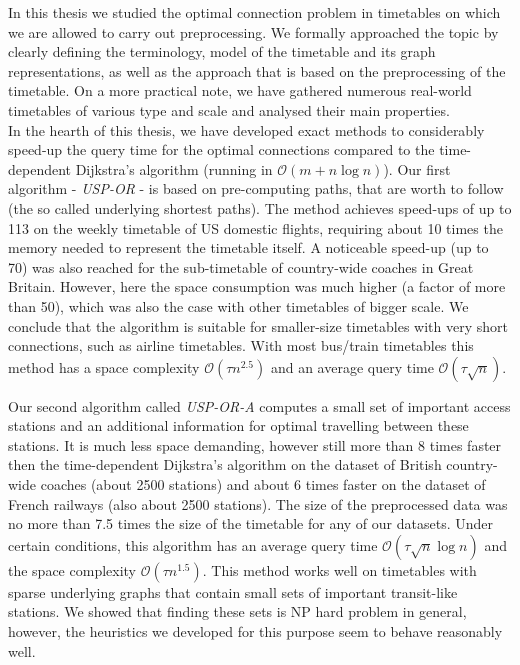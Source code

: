 \noindent In this thesis we studied the optimal connection problem in timetables on which we are allowed to carry out preprocessing. We formally approached the topic by clearly defining the terminology, model of the timetable and its graph representations, as well as the approach that is based on the preprocessing of the timetable. On a more practical note, we have gathered numerous real-world timetables of various type and scale and analysed their main properties. \\

\noindent In the hearth of this thesis, we have developed exact methods to considerably speed-up the query time for the optimal connections compared to the time-dependent Dijkstra's algorithm (running in $\mathcal{O}(m + n \log n)$). Our first algorithm - \textit{USP-OR} - is based on pre-computing paths, that are worth to follow (the so called underlying shortest paths). The method achieves speed-ups of up to 113 on the weekly timetable of US domestic flights, requiring about 10 times the memory needed to represent the timetable itself. A noticeable speed-up (up to 70) was also reached for the sub-timetable of country-wide coaches in Great Britain. However, here the space consumption was much higher (a factor of more than 50), which was also the case with other timetables of bigger scale. We conclude that the algorithm is suitable for smaller-size timetables with very short connections, such as airline timetables. With most bus/train timetables this method has a space complexity $\mathcal{O}(\tau n^{2.5})$ and an average query time $\mathcal{O}(\tau \sqrt{n})$.
	
Our second algorithm called \textit{USP-OR-A} computes a small set of important access stations and an additional information for optimal travelling between these stations. It is much less space demanding, however still more than 8 times faster then the time-dependent Dijkstra's algorithm on the dataset of British country-wide coaches (about 2500 stations) and about 6 times faster on the dataset of French railways (also about 2500 stations). The size of the preprocessed data was no more than 7.5 times the size of the timetable for any of our datasets. Under certain conditions, this algorithm has an average query time $\mathcal{O}(\tau \sqrt{n} \log n)$ and the space complexity $\mathcal{O}(\tau n^{1.5})$. This method works well on timetables with sparse underlying graphs that contain small sets of important transit-like stations. We showed that finding these sets is NP hard problem in general, however, the heuristics we developed for this purpose seem to behave reasonably well.
	

